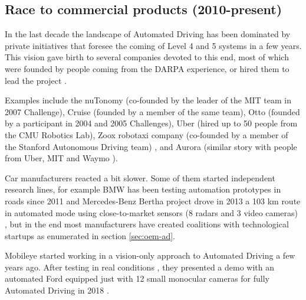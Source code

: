 \subsection{Race to commercial products (2010-present)}
 
In the last decade the landscape of Automated Driving has been dominated by 
private initiatives that foresee the coming of Level 4 and 5 systems in a few 
years. This vision gave birth to several companies devoted to this end, most of 
which were founded by people coming from the DARPA experience, or hired them to
lead the project \cite{Chapell2016}. 

Examples include the nuTonomy (co-founded
by the leader of the MIT team in 2007 Challenge), Cruise (founded by a 
member of the same team), Otto (founded by a participant in 2004 and 2005 
Challenges), Uber (hired up to 50 people from the CMU Robotics Lab),  
Zoox robotaxi company (co-founded by a member of the Stanford 
Autonomous Driving team) %
\cite{Levinson2011a}, and Aurora (similar story with people from 
Uber, MIT and Waymo \cite{Anderson2013}).

Car manufacturers reacted a bit slower. 
Some of them started independent research lines, for example
BMW has been testing automation prototypes in roads since 2011 
\cite{Aeberhard2015a} and Mercedes-Benz Bertha project \cite{Ziegler2014}
drove in 2013 a 103 km route in automated
mode using close-to-market sensors (8 radars and 3 video cameras)
, but in the end most manufacturers have created coalitions with technological
startups as enumerated in section \ref{sec:oem-ad}.


Mobileye
started working in a vision-only approach to Automated Driving
a few years ago. 
After testing in real conditions \cite{Edelstein2018}, they presented a demo 
with an automated Ford equipped just with 12 small monocular cameras for fully 
Automated Driving in 2018 \cite{Scheer2018}.

